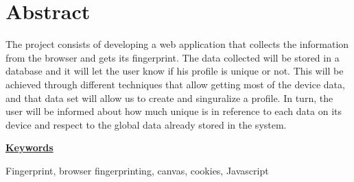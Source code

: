 \chapter*{Abstract}

The project consists of developing a web application that collects the information from the browser and gets its fingerprint. The data collected will be stored in a database and it will let the user know if his profile is unique or not. This will be achieved through different techniques that allow getting most of the device data, and that data set will allow us to create and singuralize a profile. In turn, the user will be informed about how much unique is in reference to each data on its device and respect to the global data already stored in the system. \par
\vspace{12mm}
\noindent
\underline{\Large{\textbf{Keywords}}}\par
\vspace{7mm}
\noindent
\normalsize{Fingerprint, browser fingerprinting, canvas, cookies, Javascript}